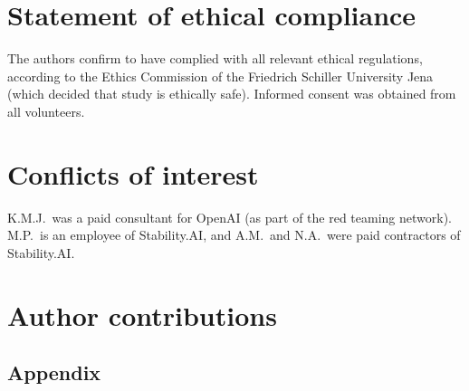 \documentclass[11pt, oneside]{article}
\begin{document}
\begin{refsection}
\section*{Statement of ethical compliance}
The authors confirm to have complied with all relevant ethical regulations, according to the Ethics Commission of the Friedrich Schiller University Jena (which decided that study is ethically safe). Informed consent was obtained from all volunteers.


\section*{Conflicts of interest}
K.M.J.\ was a paid consultant for OpenAI (as part of the red teaming network). M.P.\ is an employee of Stability.AI, and A.M.\ and N.A.\ were paid contractors of Stability.AI.

\section*{Author contributions}

\resizebox{\textwidth}{!}{%
\scriptsize
\insertcredits
}
\normalsize
\printbibliography
\end{refsection}

\clearpage
\begin{refsection}
\renewcommand{\thefigure}{A\arabic{figure}}
\setcounter{figure}{0}

\renewcommand{\thetable}{A\arabic{table}}
\setcounter{table}{0}

\appendix
\section{Appendix}

\clearpage
\printbibliography[heading=subbibintoc]
\end{refsection}
\end{document}
